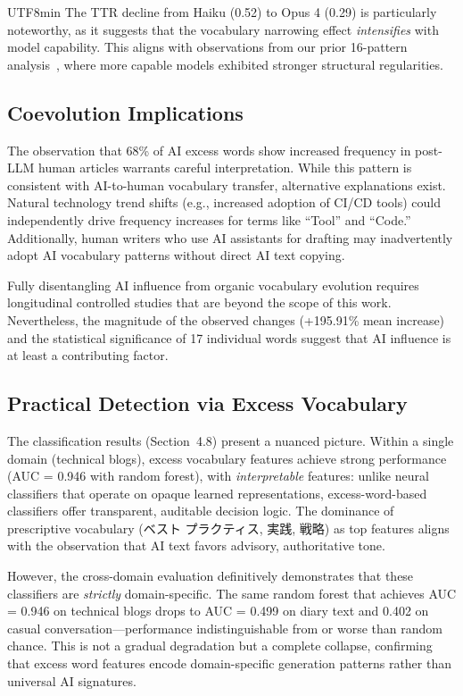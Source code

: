 \documentclass[11pt,a4paper]{article}
\begin{document}
\begin{CJK}{UTF8}{min}
The TTR decline from Haiku (0.52) to Opus 4 (0.29) is particularly noteworthy, as it suggests that the vocabulary narrowing effect \emph{intensifies} with model capability. This aligns with observations from our prior 16-pattern analysis~\citep{imoto2025slop}, where more capable models exhibited stronger structural regularities.

\subsection{Coevolution Implications}

The observation that 68\% of AI excess words show increased frequency in post-LLM human articles warrants careful interpretation. While this pattern is consistent with AI-to-human vocabulary transfer, alternative explanations exist. Natural technology trend shifts (e.g., increased adoption of CI/CD tools) could independently drive frequency increases for terms like ``Tool'' and ``Code.'' Additionally, human writers who use AI assistants for drafting may inadvertently adopt AI vocabulary patterns without direct AI text copying.

Fully disentangling AI influence from organic vocabulary evolution requires longitudinal controlled studies that are beyond the scope of this work. Nevertheless, the magnitude of the observed changes (+195.91\% mean increase) and the statistical significance of 17 individual words suggest that AI influence is at least a contributing factor.

\subsection{Practical Detection via Excess Vocabulary}

The classification results (Section~4.8) present a nuanced picture. Within a single domain (technical blogs), excess vocabulary features achieve strong performance (AUC = 0.946 with random forest), with \emph{interpretable} features: unlike neural classifiers that operate on opaque learned representations, excess-word-based classifiers offer transparent, auditable decision logic. The dominance of prescriptive vocabulary (ベスト プラクティス, 実践, 戦略) as top features aligns with the observation that AI text favors advisory, authoritative tone.

However, the cross-domain evaluation definitively demonstrates that these classifiers are \emph{strictly} domain-specific. The same random forest that achieves AUC = 0.946 on technical blogs drops to AUC = 0.499 on diary text and 0.402 on casual conversation---performance indistinguishable from or worse than random chance. This is not a gradual degradation but a complete collapse, confirming that excess word features encode domain-specific generation patterns rather than universal AI signatures.


\end{CJK}
\end{document}
